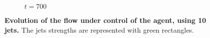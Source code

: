\begin{figure}
\begin{subfigure}[t]{\textwidth}
    	\caption{$t=700$}
	\label{fig:shkadov_fields_700}
\end{subfigure}
\caption{\textbf{Evolution of the flow under control of the agent, using 10 jets.} The jets strengths are represented with green rectangles.}
\label{fig:shkadov_fields}
\end{figure} 
